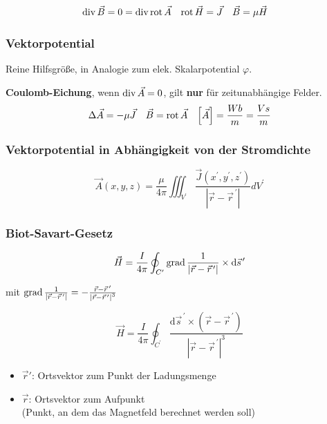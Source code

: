 	\begin{align*}
		\operatorname{div} \vec{B} &= 0 = \operatorname{div} \operatorname{rot} \vec{A} & \operatorname{rot} \vec{H} &= \vec{J} & \vec{B} &= \mu \vec{H} & \\
	\end{align*}

	\subsubsection{Vektorpotential}
		Reine Hilfsgröße, in Analogie zum elek. Skalarpotential $ \varphi $.

		\textbf{Coulomb-Eichung}, wenn $ \operatorname{div} \vec{A} = 0 $, gilt \textbf{nur} für
		zeitunabhängige Felder.
		\begin{align*}
			\Delta \vec{A} & = - \mu \vec{J}  &
			\vec{B}        & = \operatorname{rot} \vec{A} &
			\left[\vec{A} \right] = \frac{Wb}{m} = \frac{Vs}{m}
		\end{align*}

	\subsubsection{Vektorpotential in Abhängigkeit von der Stromdichte}
		\[
			\vec{A}(x, y, z)=\frac{\mu}{4 \pi} \iiint_{V^{\prime}} \frac{\vec{J}\left(x^{\prime}, y^{\prime}, z^{\prime}\right)}{\left|\vec{r}-\vec{r}^{\,\prime}\right|} d V^{\prime}
		\]

	\subsubsection{Biot-Savart-Gesetz}
		\[
			\vec{H}=\frac{I}{4 \pi} \oint_{C^{\prime}} \operatorname{grad} \frac{1}{\left|\vec{r}-\vec{r}^{\,\prime}\right|} \times \mathrm{d} \vec{s}^{\,\prime}
		\]

		mit $\operatorname{grad} \frac{1}{\left|\vec{r}-\vec{r}^{\,\prime}\right|}=-\frac{\vec{r}-\vec{r}^{\,\prime}}{\left|\vec{r}-\vec{r}^{\,\prime}\right|^{3}}$

		\[
			\vec{H}=\frac{I}{4 \pi} \oint_{C^{\prime}} \frac{\mathrm{d} \vec{s}^{\,\prime} \times\left(\vec{r}-\vec{r}^{\,\prime}\right)}{\left|\vec{r}-\vec{r}^{\,\prime}\right|^{3}}
		\]

		\begin{itemize}
			\footnotesize
			\item \(\vec{r}'\): Ortsvektor zum Punkt der Ladungsmenge
			\item \(\vec{r}\): Ortsvektor zum Aufpunkt \\ (Punkt, an dem das Magnetfeld berechnet werden soll)
		\end{itemize}

